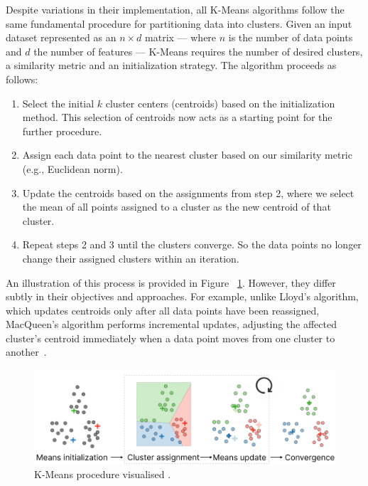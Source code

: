 \documentclass[10pt,twocolumn,letterpaper]{article}
\begin{document}
Despite variations in their implementation, all K-Means algorithms follow the
same fundamental procedure for partitioning data into clusters. Given an input
dataset represented as an $n \times d$ matrix — where $n$ is the number of data
points and $d$ the number of features — K-Means requires the number of desired
clusters, a similarity metric and an initialization strategy. The algorithm
proceeds as follows:
\begin{enumerate}
    \item Select the initial $k$ cluster centers (centroids) based on the initialization
          method. This selection of centroids now acts as a starting point for the
          further procedure.
    \item Assign each data point to the nearest cluster based on our similarity metric
          (e.g., Euclidean norm).
    \item Update the centroids based on the assignments from step 2, where we select the
          mean of all points assigned to a cluster as the new centroid of that cluster.
    \item Repeat steps 2 and 3 until the clusters converge. So the data points no longer
          change their assigned clusters within an iteration.
\end{enumerate}
An illustration of this process is provided in Figure
~\ref{fig:kmeans-procedure}. However, they differ subtly in their objectives
and approaches. For example, unlike Lloyd's algorithm, which updates centroids
only after all data points have been reassigned, MacQueen's algorithm performs
incremental updates, adjusting the affected cluster’s centroid immediately when
a data point moves from one cluster to another~\cite{Morissette2013}.

\begin{figure}[t]
    \begin{center}
        \includegraphics[width=0.8\linewidth]{figures/K-Means procedure}
    \end{center}
    \caption{K-Means procedure visualised \cite{Amidi2018}.}
    \label{fig:kmeans-procedure}
\end{figure}
\end{document}
